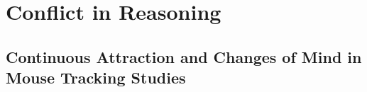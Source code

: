 \documentclass{../Dissertate}
\begin{document}
\doublespacing

\chapter{Conflict in Reasoning}






\begin{appendices}
  \appendixpage
  \graphicspath{{./../Appendices/}}
  \chapter{Continuous Attraction and Changes of Mind in Mouse Tracking Studies}\label{appendix:mouse-studies}
  
\end{appendices}


\end{document}
